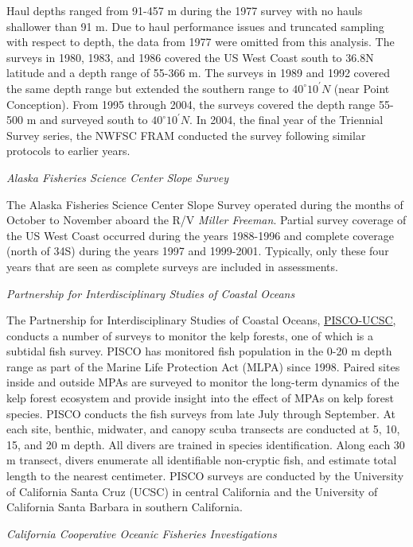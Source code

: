 \documentclass[
  english,
  a4paper,
]{article}
\begin{document}
Haul depths ranged from 91-457 m during the 1977 survey with no hauls shallower
than 91 m.
Due to haul performance issues and truncated sampling with respect to depth, the
data from 1977 were omitted from this analysis.
The surveys in 1980, 1983, and 1986 covered the US West Coast south to
36.8\textdegree N latitude and a depth range of 55-366 m.
The surveys in 1989 and 1992 covered the same depth range but extended the
southern range to $40^\circ 10^\prime N$ (near Point Conception).
From 1995 through 2004, the surveys covered the depth range 55-500 m and
surveyed south to $40^\circ 10^\prime N$.
In 2004, the final year of the Triennial Survey series, the NWFSC FRAM
conducted the survey following similar protocols to earlier years.

\emph{Alaska Fisheries Science Center Slope Survey}

The Alaska Fisheries Science Center Slope Survey operated during the months of October to November aboard the
R/V \emph{Miller Freeman}.
Partial survey coverage of the US West Coast occurred during the years 1988-1996
and complete coverage (north of 34\textquotesingle S) during the
years 1997 and 1999-2001.
Typically, only these four years that are seen as complete surveys are included
in assessments.

\emph{Partnership for Interdisciplinary Studies of Coastal Oceans}

The Partnership for Interdisciplinary Studies of Coastal Oceans,
\href{http://www.piscoweb.org/kelp-forest-study}{PISCO-UCSC}, conducts a number of surveys
to monitor the kelp forests, one of which is a subtidal fish survey. PISCO
has monitored fish population in the 0-20 m depth range as part of the
Marine Life Protection Act (MLPA) since 1998. Paired sites inside and outside MPAs
are surveyed to monitor the long-term dynamics of the kelp forest ecosystem and provide
insight into the effect of MPAs on kelp forest species. PISCO conducts the fish
surveys from late July through September. At each site, benthic, midwater, and canopy
scuba transects are conducted at 5, 10, 15, and 20 m depth. All divers are trained
in species identification. Along each 30 m transect, divers enumerate all identifiable
non-cryptic fish, and estimate total length to the nearest centimeter. PISCO surveys
are conducted by the University of California Santa Cruz (UCSC) in central California and the University of California Santa Barbara in southern California.

\emph{California Cooperative Oceanic Fisheries Investigations}
\end{document}

